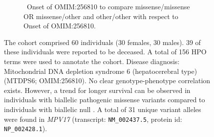 \begin{figure}[htbp]
\vspace{0.2em}

\begin{subfigure}[b]{0.95\textwidth}
\captionsetup{justification=raggedright,singlelinecheck=false}
\caption{ Onset of OMIM:256810 to compare missense/missense OR missense/other and other/other with respect to Onset of OMIM:256810. }
\end{subfigure}

\vspace{0.2em}

\caption{ The cohort comprised 60 individuals (30 females, 30 males). 39 of these individuals were reported to be deceased. 
A total of 156 HPO terms were used to annotate the cohort. Disease diagnosis: Mitochondrial DNA depletion syndrome 6 (hepatocerebral type) (MTDPS6; OMIM:256810). 
No clear genotype-phenotype correlation exists. However, a trend for longer survival can be observed in individuals with biallelic pathogenic 
missense variants compared to individuals with biallelic null \cite{PMID_20074988,PMID_22593919}. 
A total of 31 unique variant alleles were found in \textit{MPV17} (transcript: \texttt{NM\_002437.5}, protein id: \texttt{NP\_002428.1}).}
\end{figure}
